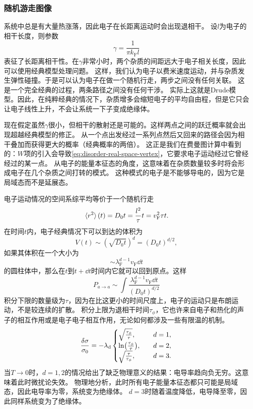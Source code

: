 \subsubsection{随机游走图像}

系统中总是有大量热涨落，因此电子在长距离运动时会出现退相干。
设$l$为电子的相干长度，则参数
\begin{equation}
    \gamma = \frac{1}{\pi k_\text{F} l}
\end{equation}
表征了长距离相干性。在$\gamma$非常小时，两个杂质的间距远大于电子相关长度，因此可以使用经典模型处理问题。
这样，我们认为电子以费米速度运动，并与杂质发生弹性碰撞。于是可以认为电子在做一个随机行走，两步之间没有任何关联。
这是一个完全经典的过程，两条路径之间没有任何干涉。
实际上这就是Drude模型。因此，在纯粹经典的情况下，杂质增多会缩短电子的平均自由程，但是它只会让电子线性上升，不会让系统一下子变成绝缘体。

现在假定虽然$\gamma$很小，但相干的散射还是可能的。这样两点之间的跃迁概率就会出现超越经典模型的修正。
从一个点出发经过一系列点然后又回来的路径会因为相干叠加而获得更大的概率（经典概率的两倍）。
这正是我们在费曼图计算中看到的：$W$项的引入会导致\eqref{eq:disorder-real-space-vertex}，它要求电子运动经过它曾经经过的某一点。
从电子的能量本征态的角度，这意味着在杂质数量较多时将会形成电子在几个杂质之间打转的模式。
这种模式的电子是不能够导电的，因为它是局域态而不是延展态。

电子运动情况的空间系综平均等价于一个随机行走
\[
    \expval*{r^2}(t) = D_0 t = \frac{l^2}{\tau} t = v_\text{F}^2 \tau t.
\]
在时间$t$内，电子经典情况下可以到达的体积为
\[
    V(t) \sim (\sqrt{D_0 t})^d = (D_0 t)^{d/2},
\]
如果其体积在一个大小为
\[
    \sim \lambda_\text{F}^{d-1} v_\text{F} \dd{t}
\]
的圆柱体中，那么在$t$到$t+\dd{t}$时间内它就可以回到原点。这样
\[
    P_{a \to a} \sim \int \frac{\lambda_\text{F}^{d-1} v_\text{F} \dd{t}}{(D_0 t)^{d/2}} 
\]
积分下限的数量级为$\tau$，因为在比这更小的时间尺度上，电子的运动只是布朗运动，不是较连续的扩散。
积分上限为退相干时间$\tau_\phi$，它也许来自电子和热化的声子的相互作用或是电子电子相互作用，无论如何都涉及一些有限温的机制。
\[
    \frac{\var{\sigma}}{\sigma_0} = - \lambda_\text{d} \begin{cases}
        \sqrt{\frac{\tau_\phi}{\tau}}, \quad &d = 1, \\
        \ln(\frac{\tau_\phi}{\tau}) , \quad &d = 2, \\
        \sqrt{\frac{\tau}{\tau_\phi}} , \quad &d = 3.
    \end{cases}
\]
当$T\to 0$时，$d=1, 2$的情况给出了缺乏物理意义的结果：电导率趋向负无穷。这意味着此时微扰论失效。
物理地分析，此时所有电子能量本征态都只可能是局域态，因此电导率为零，系统变为绝缘体。
$d=3$时随着温度降低，电导降至零，因此同样系统变为了绝缘体。

